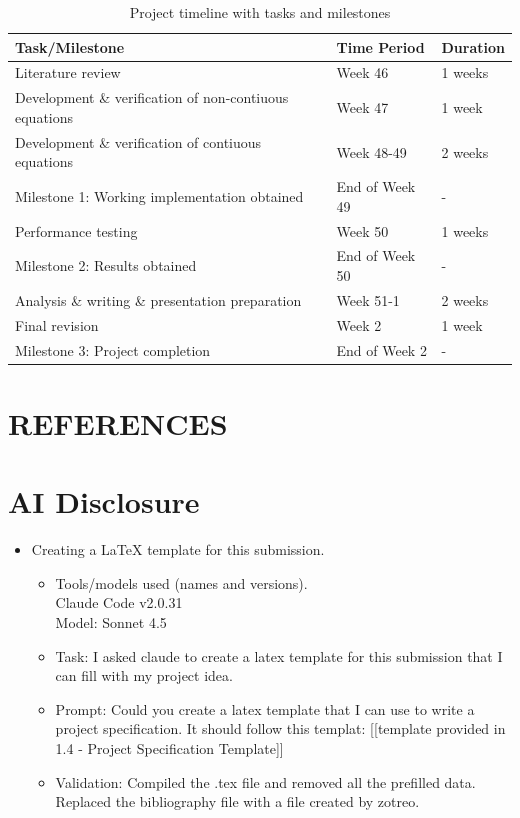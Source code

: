 \documentclass[11pt,a4paper]{article}
\begin{document}
\begin{table}[h]
\centering
\begin{tabular}{|l|l|l|}
\hline
\textbf{Task/Milestone} & \textbf{Time Period} & \textbf{Duration} \\
\hline
Literature review & Week 46 & 1 weeks \\
\hline
Development \& verification of non-contiuous equations & Week 47 & 1 week \\
\hline
Development \& verification of contiuous equations & Week 48-49 & 2 weeks \\
\hline
Milestone 1: Working implementation obtained & End of Week 49 & - \\
\hline
\hline
Performance testing & Week 50 & 1 weeks \\
\hline
Milestone 2: Results obtained & End of Week 50 & - \\
\hline
\hline
Analysis \& writing \& presentation preparation & Week 51-1 & 2 weeks \\
\hline
Final revision & Week 2 & 1 week \\
\hline
Milestone 3: Project completion & End of Week 2 & - \\
\hline
\end{tabular}
\caption{Project timeline with tasks and milestones}
\end{table}

\section{REFERENCES}
\printbibliography[heading=none]

\section{AI Disclosure}
\begin{itemize}
\item Creating a LaTeX template for this submission.
\begin{itemize}
\item Tools/models used (names and versions).\\
  Claude Code v2.0.31\\
  Model: Sonnet 4.5
\item Task: I asked claude to create a latex template for this submission that I can fill with my project idea.
\item Prompt: Could you create a latex template that I can use to write a project specification. It should follow this templat: [[template provided in 1.4 - Project Specification Template]]
\item Validation: Compiled the .tex file and removed all the prefilled data. Replaced the bibliography file with a file created by zotreo.
\end{itemize}
\end{itemize}
\end{document}
